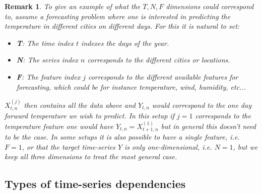 \documentclass{article}
\newtheorem{remark}{Remark}
\begin{document}
\begin{remark}
To give an example of what the $T,N,F$ dimensions could correspond to, assume a forecasting problem where one is interested in predicting the temperature in different cities on different days. For this it is natural to set:
\begin{itemize}
\item \textbf{T}: The time index $t$ indexes the days of the year.
\item \textbf{N}: The series index $n$ corresponds to the different cities or locations.
\item \textbf{F}: The feature index $j$ corresponds to the different available features for forecasting, which could be for instance temperature, wind, humidity, etc...
\end{itemize}
$X_{t,n}^{(j)}$ then contains all the data above and $Y_{t,n}$ would correspond to the one day forward temperature we wish to predict. In this setup if $j=1$ corresponds to the temperature feature one would have $Y_{t,n} = X_{t+1, n}^{(1)}$ but in general this doesn't need to be the case.
In some setups it is also possible to have a single feature, i.e. $F=1$, or that the target time-series $Y$ is only one-dimensional, i.e. $N=1$, but we keep all three dimensions to treat the most general case.
\end{remark}



\subsection{Types of time-series dependencies}
\end{document}
